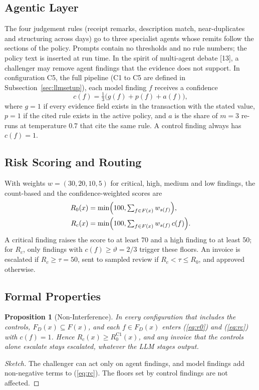 \documentclass[9pt,a4paper,twocolumn]{extarticle}
\newtheorem{proposition}{Proposition}
\begin{document}
\subsection{Agentic Layer}
The four judgement rules (receipt remarks, description match, near-duplicates and structuring across days) go to three specialist agents whose remits follow the sections of the policy. Prompts contain no thresholds and no rule numbers; the policy text is inserted at run time. In the spirit of multi-agent debate [13], a challenger may remove agent findings that the evidence does not support. In configuration C5, the full pipeline (C1 to C5 are defined in Subsection~\ref{sec:llmsetup}), each model finding $f$ receives a confidence
\begin{equation}
c(f)=\tfrac{1}{3}\bigl(g(f)+p(f)+a(f)\bigr),
\label{eq:conf}
\end{equation}
where $g=1$ if every evidence field exists in the transaction with the stated value, $p=1$ if the cited rule exists in the active policy, and $a$ is the share of $m=3$ re-runs at temperature 0.7 that cite the same rule. A control finding always has $c(f)=1$.

\subsection{Risk Scoring and Routing}
With weights $w=(30,20,10,5)$ for critical, high, medium and low findings, the count-based and the confidence-weighted scores are
\begin{align}
R_0(x)&=\min\Bigl(100,\textstyle\sum_{f\in F(x)}w_{s(f)}\Bigr),\label{eq:r0}\\
R_c(x)&=\min\Bigl(100,\textstyle\sum_{f\in F(x)}w_{s(f)}\,c(f)\Bigr).\label{eq:rc}
\end{align}
A critical finding raises the score to at least 70 and a high finding to at least 50; for $R_c$, only findings with $c(f)\ge\vartheta=2/3$ trigger these floors. An invoice is escalated if $R_c\ge\tau=50$, sent to sampled review if $R_c<\tau\le R_0$, and approved otherwise.

\subsection{Formal Properties}
\begin{proposition}[Non-Interference]\label{prop:ni}
In every configuration that includes the controls, $F_D(x)\subseteq F(x)$, and each $f\in F_D(x)$ enters (\ref{eq:r0}) and (\ref{eq:rc}) with $c(f)=1$. Hence $R_c(x)\ge R_0^{\mathrm{C1}}(x)$, and any invoice that the controls alone escalate stays escalated, whatever the LLM stages output.
\end{proposition}
\begin{proof}[Sketch]
The challenger can act only on agent findings, and model findings add non-negative terms to (\ref{eq:rc}). The floors set by control findings are not affected. \qedhere
\end{proof}
\end{document}
